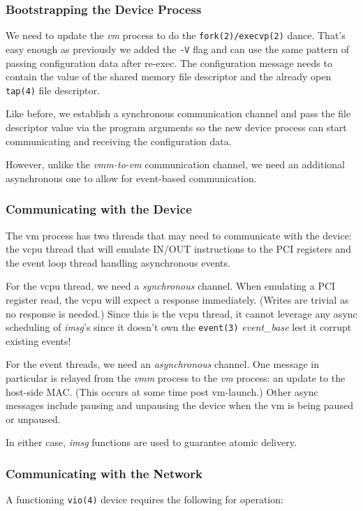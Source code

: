 \documentclass[conference]{IEEEtran}
\begin{document}
\vspace{2mm}
\subsubsection{Bootstrapping the Device Process}
We need to update the \emph{vm} process to do the
\texttt{fork(2)/execvp(2)} dance. That's easy enough as previously we
added the \texttt{-V} flag and can use the same pattern of passing
configuration data after re-exec. The configuration message needs to
contain the value of the shared memory file descriptor and the already
open \texttt{tap(4)} file descriptor.

Like before, we establish a synchronous communication channel and pass
the file descriptor value via the program arguments so the new device
process can start communicating and receiving the configuration data.

However, unlike the \emph{vmm-to-vm} communication channel, we need an
additional asynchronous one to allow for event-based communication.


\vspace{2mm}
\subsubsection{Communicating with the Device}
The vm process has two threads that may need to communicate with the
device: the vcpu thread that will emulate IN/OUT instructions to the
PCI registers and the event loop thread handling asynchronous events.

For the vcpu thread, we need a \emph{synchronous} channel. When
emulating a PCI register read, the vcpu will expect a response
immediately. (Writes are trivial as no response is needed.) Since this
is the vcpu thread, it cannot leverage any async scheduling of
\emph{imsg}'s since it doesn't own the \texttt{event(3)}
\emph{event\_base} lest it corrupt existing events!

For the event threads, we need an \emph{asynchronous} channel. One
message in particular is relayed from the \emph{vmm} process to the
\emph{vm} process: an update to the host-side MAC. (This occurs at
some time post vm-launch.) Other async messages include pausing and
unpausing the device when the vm is being paused or unpaused.

In either case, \emph{imsg} functions are used to guarantee atomic
delivery.

\vspace{2mm}
\subsubsection{Communicating with the Network}
A functioning \texttt{vio(4)} device requires the following for
operation:
\end{document}
